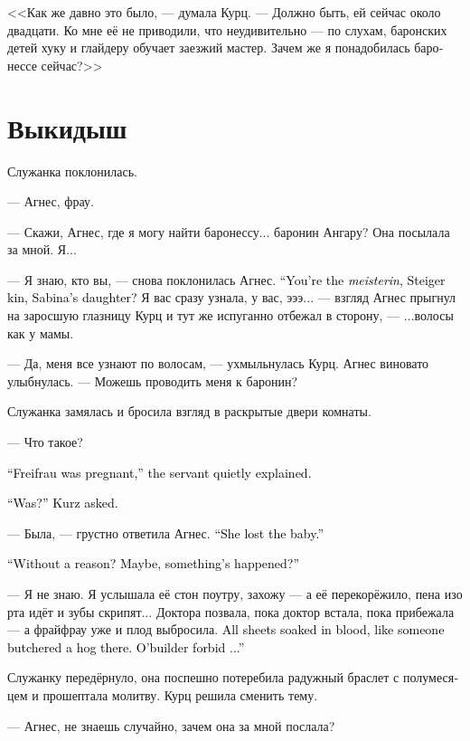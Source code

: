 \documentclass[a4paper,12pt,fleqn]{book}\usepackage{cooltooltips}\usepackage{polyglossia}\setdefaultlanguage[babelshorthands=true]{russian}\setotherlanguage{english}\defaultfontfeatures{Ligatures=TeX,Mapping=tex-text} \usepackage{xcolor}\definecolor{lightgray}{HTML}{bbbbbb}\color{lightgray}\newcommand{\ml}[3]{\textenglish{\textcolor{black}{#3}}}
\begin{document}
<<Как же давно это было, --- думала Курц.
--- Должно быть, ей сейчас около двадцати.
Ко мне её не приводили, что неудивительно --- по слухам, баронских детей хуку и глайдеру обучает заезжий мастер.
Зачем же я понадобилась баронессе сейчас?>>

\section{Выкидыш}

Служанка поклонилась.

--- Агнес, фрау.

--- Скажи, Агнес, где я могу найти баронессу... баронин Ангару?
Она посылала за мной.
Я...

--- Я знаю, кто вы, --- снова поклонилась Агнес.
\ml{$0$}
{--- Вы майстерин из Штайгеров, дочь Сабины?}
{``You're the \textit{meisterin}, Steiger kin, Sabina's daughter?}
Я вас сразу узнала, у вас, эээ... --- взгляд Агнес прыгнул на заросшую глазницу Курц и тут же испуганно отбежал в сторону, --- ...волосы как у мамы.

--- Да, меня все узнают по волосам, --- ухмыльнулась Курц.
Агнес виновато улыбнулась.
--- Можешь проводить меня к баронин?

Служанка замялась и бросила взгляд в раскрытые двери комнаты.

--- Что такое?

\ml{$0$}
{--- Фрайфрау была беременна, --- шёпотом пояснила служанка.}
{``Freifrau was pregnant,'' the servant quietly explained.}

\ml{$0$}
{--- Была? --- уточнила Курц.}
{``Was?'' Kurz asked.}

--- Была, --- грустно ответила Агнес.
\ml{$0$}
{--- Выкидыш.}
{``She lost the baby.''}

\ml{$0$}
{--- Сам по себе?}
{``Without a reason?}
\ml{$0$}
{Может, случилось чего?}
{Maybe, something's happened?''}

--- Я не знаю.
Я услышала её стон поутру, захожу --- а её перекорёжило, пена изо рта идёт и зубы скрипят...
Доктора позвала, пока доктор встала, пока прибежала --- а фрайфрау уже и плод выбросила.
\ml{$0$}
{Вся постель в крови, как будто свинью резали.}
{All sheets soaked in blood, like someone butchered a hog there.}
\ml{$0$}
{Не приведи Всестроитель...}
{O'builder forbid ...''}

Служанку передёрнуло, она поспешно потеребила радужный браслет с полумесяцем и прошептала молитву.
Курц решила сменить тему.

--- Агнес, не знаешь случайно, зачем она за мной послала?
\end{document}
